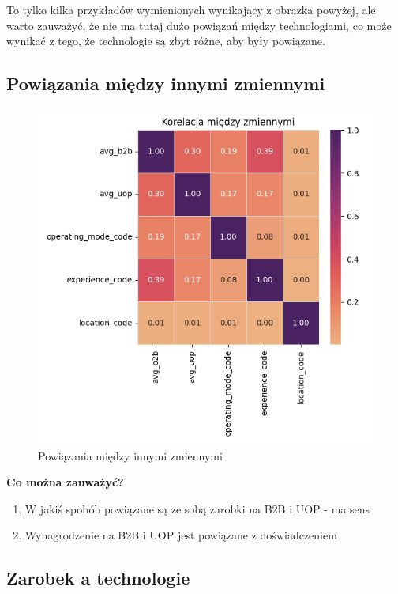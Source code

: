 \documentclass[a4paper]{article}
\begin{document}
\quad To tylko kilka przykładów wymienionych wynikający z obrazka powyżej, ale warto zauważyć, że nie ma tutaj dużo
powiązań między technologiami, co może wynikać z tego, że technologie są zbyt różne, aby były powiązane.


\subsection{Powiązania między innymi zmiennymi}

\begin{figure}[H]
    \centering
    \includegraphics[width=\textwidth]{../analysis/plots/korelacje/korelacja_między_zmiennymi.png}
    \caption{Powiązania między innymi zmiennymi}
\end{figure}

\quad \textbf{Co można zauważyć?}

\begin{enumerate}
    \item W jakiś spobób powiązane są ze sobą zarobki na B2B i UOP - ma sens
    \item Wynagrodzenie na B2B i UOP jest powiązane z doświadczeniem
\end{enumerate}


\subsection{Zarobek a technologie}
\end{document}
